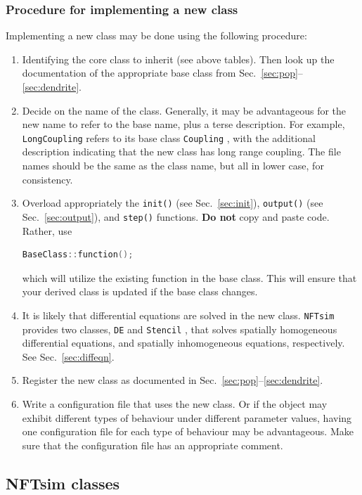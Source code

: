 \documentclass[12pt,a4paper]{article}
\newcommand{\type}[1]{{\small\small\tt #1} }
\newcommand{\NF}[0]{\type{NFTsim}}
\begin{document}
\subsubsection{Procedure for implementing a new class}

Implementing a new class may be done using the following procedure:
\begin{enumerate}
    \item Identifying the core class to inherit (see above tables). Then look up the documentation of the appropriate base class from Sec.~\ref{sec:pop}--\ref{sec:dendrite}.
    \item Decide on the name of the class. Generally, it may be advantageous for the new name to refer to the base name, plus a terse description. For example, \type{LongCoupling} refers to its base class \type{Coupling}, with the additional description indicating that the new class has long range coupling. The file names should be the same as the class name, but all in lower case, for consistency.
    \item Overload appropriately the \type{init()} (see Sec.~\ref{sec:init}), \type{output()} (see Sec.~\ref{sec:output}), and \type{step()} functions. {\bf Do not} copy and paste code. Rather, use
        \begin{lstlisting}[language=C++]
BaseClass::function();
        \end{lstlisting}
    which will utilize the existing function in the base class. This will ensure that your derived class is updated if the base class changes.
    \item It is likely that differential equations are solved in the new class. \NF provides two classes, \type{DE} and \type{Stencil}, that solves spatially homogeneous differential equations, and spatially inhomogeneous equations, respectively. See Sec.~\ref{sec:diffeqn}.
    \item Register the new class as documented in Sec.~\ref{sec:pop}--\ref{sec:dendrite}.
    \item Write a configuration file that uses the new class. Or if the object may exhibit different types of behaviour under different parameter values, having one configuration file for each type of behaviour may be advantageous. Make sure that the configuration file has an appropriate comment.
\end{enumerate}

\subsection{NFTsim classes}
\end{document}
